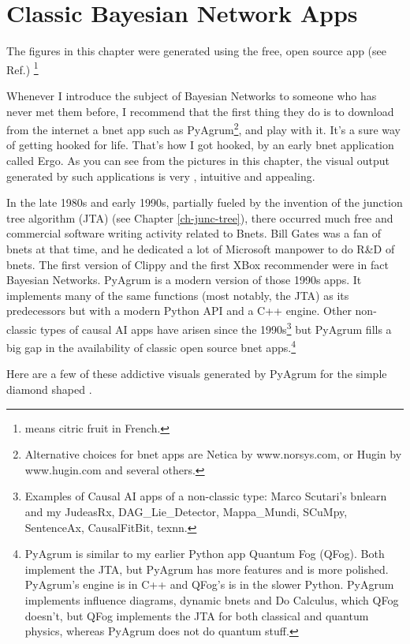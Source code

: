 \chapter{Classic Bayesian Network Apps}
\label{ch-bnet-apps}

The figures in this chapter were generated using
the free, open source app  (see Ref.\cite{pyagrum})
\footnote{ means citric fruit in French. }


Whenever I introduce the subject of Bayesian Networks
to someone who has never met them before, I recommend that the first thing they do is to
download from the internet a  bnet app  such as
PyAgrum\footnote{Alternative choices for bnet apps are Netica by www.norsys.com, or Hugin by www.hugin.com and several others.}, and play with it. It's a sure way of getting hooked
for life. That's how I got hooked, by an early bnet application called Ergo. As you can see from the pictures in this chapter,
the visual output generated by such applications is very ,
 intuitive and appealing.

  
In the late 1980s and early 1990s, partially fueled by the invention of
the junction tree algorithm (JTA) (see Chapter \ref{ch-junc-tree}), there
occurred much free and commercial software writing activity related to Bnets. Bill Gates was a fan of bnets at that time, and he dedicated a lot of Microsoft manpower to do R\&D of bnets. The first version of Clippy and the first XBox recommender were in fact Bayesian Networks. PyAgrum is a modern version of those  1990s apps. It implements many of the same functions (most notably, the JTA) as its predecessors but with a modern Python API and a C++ engine. Other non-classic types of causal AI apps have arisen since the 1990s\footnote{Examples of Causal AI apps of a non-classic type:  Marco Scutari's bnlearn and my JudeasRx, DAG\_Lie\_Detector, Mappa\_Mundi, SCuMpy, SentenceAx, CausalFitBit, texnn.} but PyAgrum fills a big gap in the availability of classic open source bnet apps.\footnote{PyAgrum is similar to my earlier Python app Quantum Fog (QFog). Both implement the JTA, but PyAgrum  has more features and is more polished.
PyAgrum's engine is in C++ and QFog's is in the slower Python.  PyAgrum implements influence diagrams, dynamic bnets
and Do Calculus, which QFog doesn't, but QFog implements the JTA for both classical and quantum physics, whereas PyAgrum does not do quantum stuff.}

Here are a few of these addictive visuals generated by PyAgrum
for the simple diamond shaped  .

